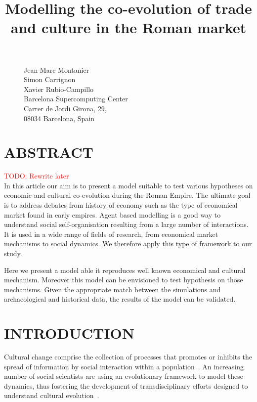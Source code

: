 \documentclass{wscpaperproc}
\newcommand{\memo}[2]{\textcolor{#1}{#2}}
\newcommand{\todo}[1]{\memo{red}{TODO: #1\\}}
\begin{document}

\title{Modelling the co-evolution of trade and culture in the Roman market}

\maketitle

\begin{figure}[htb]
{
\centering
Jean-Marc Montanier\\
Simon Carrignon\\ 
Xavier Rubio-Campillo\\
\vspace{12pt}
Barcelona Supercomputing Center\\
Carrer de Jordi Girona, 29, \\
08034 Barcelona, Spain\\
}
\end{figure}


\section*{ABSTRACT}

\todo{Rewrite later}
In this article our aim is to present a model suitable to test various hypotheses on economic and cultural co-evolution during the Roman Empire. The ultimate goal is to address debates from history of economy such as the type of economical market found in early empires. Agent based modelling is a good way to understand social self-organisation resulting from a large number of interactions. It is used in a wide range of fields of research, from economical market mechanisms to social dynamics. We therefore apply this type of framework to our study.

Here we present a model able it reproduces well known economical and cultural mechanism. Moreover this model can be envisioned to test hypothesis on those mechanisms. Given the appropriate match between the simulations and archaeological and historical data, the results of the model can be validated.


\section{INTRODUCTION}\label{sec:intro}


Cultural change comprise the collection of processes that promotes or inhibits the spread of information by social interaction within a population~. An increasing number of social scientists are using an evolutionary framework to model these dynamics, thus fostering the development of transdisciplinary efforts designed to understand cultural evolution~.
\end{document}
